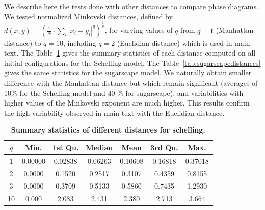 \documentclass{JASSS}
\begin{document}
We describe here the tests done with other distances to compare phase diagrams. We tested normalized Minkovski distances, defined by $d(x,y) = \left(\frac{1}{N}\cdot \sum_i \left|x_i - y_i\right|^{q}\right)^{\frac{1}{q}}$, for varying values of $q$ from $q = 1$ (Manhattan distance) to $q = 10$, including $q = 2$ (Euclidian distance) which is used in main text. The Table~\ref{tab:schellingdistances} gives the summary statistics of each distance computed on all initial configurations for the Schelling model. The Table~\ref{tab:sugarscapedistances} gives the same statistics for the sugarscape model. We naturally obtain smaller difference with the Manhattan distance but which remain significant (averages of 10\% for the Schelling model and 40 \% for sugarscape), and variabilities with higher values of the Minkovski exponent are much higher. This results confirm the high variability observed in main text with the Euclidian distance.





\begin{table}[!t]
	
	\centering
	\begin{tabular}{|c|cccccc|}
	\hline
    	$q$ & Min. & 1st Qu. & Median & Mean & 3rd Qu. & Max. \\\hline
        1 & 0.00000 & 0.02838 & 0.06263 & 0.10608 & 0.16818 & 0.37018 \\
        2 & 0.0000 & 0.1520 & 0.2517 & 0.3107 & 0.4359 & 0.8155 \\
        3 & 0.0000 & 0.3709 & 0.5133 & 0.5860 & 0.7435 & 1.2930 \\
        10 & 0.000 & 2.083 & 2.431 & 2.380 & 2.713 & 3.664 \\\hline
    \end{tabular}
    \caption{\textbf{Summary statistics of different distances for schelling.}}\label{tab:schellingdistances}
\end{table}
\end{document}
